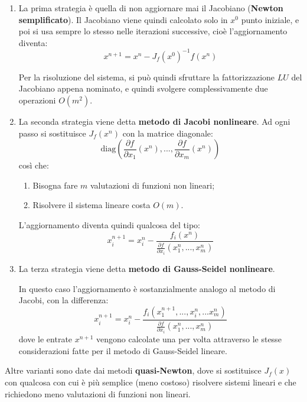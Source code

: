 \documentclass[a4paper,11pt]{article}
\begin{document}
\begin{enumerate}
	\item La prima strategia è quella di non aggiornare mai il Jacobiano (\textbf{Newton semplificato}).
		Il Jacobiano viene quindi calcolato solo in $x^0$ punto iniziale, e poi si usa sempre lo stesso nelle iterazioni successive, cioè l'aggiornamento diventa:
		$$
			x^{n + 1} = x^n - J_f(x^0)^{-1} f(x^n)
		$$
		
		Per la risoluzione del sistema, si può quindi sfruttare la fattorizzazione $LU$ del Jacobiano appena nominato, e quindi svolgere complessivamente due operazioni $O(m^2)$.

	\item La seconda strategia viene detta \textbf{metodo di Jacobi nonlineare}.
		Ad ogni passo si sostituisce $J_f(x^n)$ con la matrice diagonale:
		$$
		\mathrm{diag} \left( \frac{\partial f}{\partial x_1} (x^n), ..., \frac{\partial f}{\partial x_m} (x^n) \right)
		$$
		così che:
		\begin{enumerate}
			\item Bisogna fare $m$ valutazioni di funzioni non lineari;
			\item Risolvere il sistema lineare costa $O(m)$.
		\end{enumerate}

		L'aggiornamento diventa quindi qualcosa del tipo:
		$$
		x_i^{n + 1} = x_i^n - \frac{f_i(x^n)}{\frac{\partial f}{\partial x_i} (x_1^n, ..., x_m^n)}
		$$

	\item La terza strategia viene detta \textbf{metodo di Gauss-Seidel nonlineare}.

		In questo caso l'aggiornamento è sostanzialmente analogo al metodo di Jacobi, con la differenza:
		$$
		x_i^{n + 1} = x_i^n - \frac{f_i(x_1^{n + 1}, ..., x_i^{n}, ... x_m^n)}{\frac{\partial f}{\partial x_i} (x_1^n, ..., x_m^n)}
		$$
		dove le entrate $x^{n + 1}$ vengono calcolate una per volta attraverso le stesse considerazioni fatte per il metodo di Gauss-Seidel lineare.
\end{enumerate}

Altre varianti sono date dai metodi \textbf{quasi-Newton}, dove si sostituisce $J_f(x)$ con qualcosa con cui è più semplice (meno costoso) risolvere sistemi lineari e che richiedono meno valutazioni di funzioni non lineari.
\end{document}

